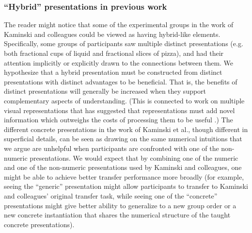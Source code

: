 \documentclass[man,10pt]{apa6}
\begin{document}
\subsubsection{``Hybrid'' presentations in previous work }
The reader might notice that some of the experimental groups in the work of Kaminski and colleagues could be viewed as having hybrid-like elements. Specifically, some groups of participants saw multiple distinct presentations (e.g. both fractional cups of liquid and fractional slices of pizza), and had their attention implicitly or explicitly drawn to the connections between them. We hypothesize that a hybrid presentation must be constructed from distinct presentations with distinct advantages to be beneficial. That is, the benefits of distinct presentations will generally be increased when they support complementary aspects of understanding. (This is connected to work on multiple visual representations that has suggested that representations must add novel information which outweighs the costs of processing them to be useful \cite{Rau2016}.) The different concrete presentations in the work of Kaminski et al., though different in superficial details, can be seen as drawing on the same numerical intuitions that we argue are unhelpful when participants are confronted with one of the non-numeric presentations. We would expect that by combining one of the numeric and one of the non-numeric presentations used by Kaminski and colleagues, one might be able to achieve better transfer performance more broadly (for example, seeing the ``generic'' presentation might allow participants to transfer to Kaminski and colleagues' original transfer task, while seeing one of the ``concrete'' presentations might give better ability to generalize to a new group order or a new concrete instantiation that shares the numerical structure of the taught concrete presentations). 
\end{document}
